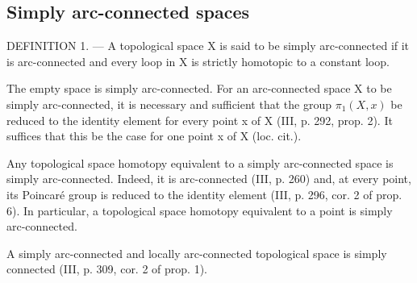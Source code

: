 \subsection{Simply arc-connected spaces}

DEFINITION 1. --- A topological space X is said to be simply arc-connected if it is arc-connected and every loop in X is strictly homotopic to a constant loop.

The empty space is simply arc-connected. For an arc-connected space X to be simply arc-connected, it is necessary and sufficient that the group \(\pi_{1}(X,x)\) be reduced to the identity element for every point x of X (III, p. 292, prop. 2). It suffices that this be the case for one point x of X (loc. cit.).

Any topological space homotopy equivalent to a simply arc-connected space is simply arc-connected. Indeed, it is arc-connected (III, p. 260) and, at every point, its Poincaré group is reduced to the identity element (III, p. 296, cor. 2 of prop. 6). In particular, a topological space homotopy equivalent to a point is simply arc-connected.

A simply arc-connected and locally arc-connected topological space is simply connected (III, p. 309, cor. 2 of prop. 1).
\relax{}
